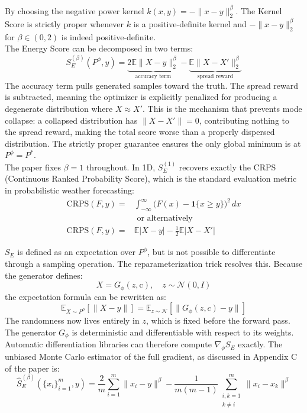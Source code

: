 By choosing the negative power kernel $k(x,y) = -\|x - y\|_2^\beta$. 
The Kernel Score is strictly proper whenever $k$ is a positive-definite kernel and $-\|x - y\|_2^\beta$ for $\beta \in (0,2)$ is indeed positive-definite.\\

The Energy Score can be decomposed in two terms:
$$S_E^{(\beta)}(P^\phi, y) = \underbrace{2\mathbb{E}\|X - y\|_2^\beta}_{\text{accuracy term}} - \underbrace{\mathbb{E}\|X - X'\|_2^\beta}_{\text{spread reward}}$$
The accuracy term pulls generated samples toward the truth. The spread reward is subtracted, meaning the optimizer is explicitly penalized for producing a degenerate distribution where $X \approx X'$. 
This is the mechanism that prevents mode collapse: a collapsed distribution has $\|X - X'\| = 0$, contributing nothing to the spread reward, making the total score worse than a properly dispersed distribution. The strictly proper guarantee ensures the only global minimum is at $P^\phi = P^*$.\\

The paper fixes $\beta = 1$ throughout. In 1D, $S_E^{(1)}$ recovers exactly the CRPS (Continuous Ranked Probability Score), which is the standard evaluation metric in probabilistic weather forecasting:
\begin{equation}
    \label{eq:crps}
    \begin{aligned}
        \mathrm{CRPS}(F, y) =& \int_{-\infty}^{\infty} \big(F(x) - \mathbf{1}\{x \ge y\}\big)^2 \, dx\\
        &\text{ or alternatively }\\
      \mathrm{CRPS}(F, y)  =& \mathbb{E}|X - y| - \frac{1}{2}\mathbb{E}|X - X'|
    \end{aligned}
\end{equation}


$S_E$ is defined as an expectation over $P^\phi$, but is not possible to differentiate through a sampling operation.
The reparameterization trick resolves this. Because the generator defines:
$$X = G_\phi(z, \text{c}), \quad z \sim \mathcal{N}(0, I)$$
the expectation formula can be rewritten as:
$$\mathbb{E}_{X \sim P^\phi}[\|X - y\|] = \mathbb{E}_{z \sim \mathcal{N}}[\|G_\phi(z, c) - y\|]$$
The randomness now lives entirely in $z$, which is fixed before the forward pass. 
The generator $G_\phi$ is deterministic and differentiable with respect to its weights. Automatic differentiation libraries can therefore compute $\nabla_\phi S_E$ exactly.
The unbiased Monte Carlo estimator of the full gradient, as discussed in Appendix C of the paper \cite{srforgan:srforgan} is:
\begin{equation}
    \label{eq:energy_score_estimator}
    \hat{S}_E^{(\beta)}(\{x_i\}_{i=1}^m, y) = \frac{2}{m}\sum_{i=1}^m \|x_i - y\|^\beta - \frac{1}{m(m-1)}\sum_{\substack{i,k=1 \\ k \neq i}}^m \|x_i - x_k\|^\beta
\end{equation}

